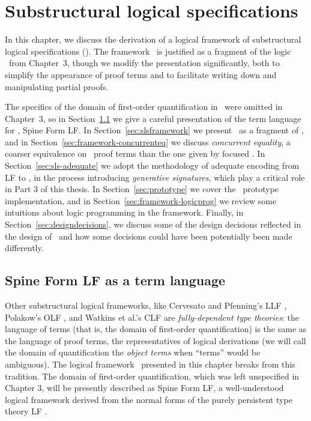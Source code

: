 \chapter{Substructural logical specifications}
\label{chapter-framework}

In this chapter, we discuss the derivation of a logical framework of
substructural logical specifications (\sls). The framework \sls~is
justified as a fragment of the logic \ollll~from Chapter~3, though we
modify the presentation significantly, both to simplify the appearance
of proof terms and to facilitate writing down and manipulating partial
proofs.

The specifics of the domain of first-order quantification in
\ollll~were omitted in Chapter~3, so in
Section~\ref{sec:sls-termlanguage} we give a careful presentation of
the term language for \sls, Spine Form LF. 
%
In Section~\ref{sec:slsframework} we present \sls~as a fragment of
\ollll, and in Section~\ref{sec:framework-concurrenteq} we discuss
{\it concurrent equality}, a coarser equivalence on \sls~proof
terms than the one given by focused \ollll. 
%
In Section~\ref{sec:sls-adequate} we adopt the methodology of adequate
encoding from LF to \sls, in the process introducing {\it generative
  signatures}, which play a critical role in Part 3 of this thesis.
%
In Section~\ref{sec:prototype} we cover the \sls~prototype
implementation, and in Section~\ref{sec:framework-logicprog} we review
some intuitions about logic programming in the framework. 
%
Finally, in Section~\ref{sec:designdecisions}, we discuss some of the
design decisions reflected in the design of \sls~and how some
decisions could have been potentially been made differently.

\section{Spine Form LF as a term language}
\label{sec:sls-termlanguage}

Other substructural logical frameworks, like Cervesato and Pfenning's
LLF \cite{cervesato02linear}, Polakow's OLF \cite{polakow01ordered},
and Watkins et al.'s CLF \cite{watkins02concurrent} are {\it
  fully-dependent type theories}: the language of terms (that is, the
domain of first-order quantification) is the same as the language of
proof terms, the representatives of logical derivations (we will call
the domain of quantification the {\it object terms} when ``terms''
would be ambiguous). The logical framework \sls~presented in this
chapter breaks from this tradition. The domain of first-order
quantification, which was left unspecified in Chapter 3, will be
presently described as Spine Form LF, a well-understood logical
framework derived from the normal forms of the purely persistent type
theory LF \cite{harper93framework}.

